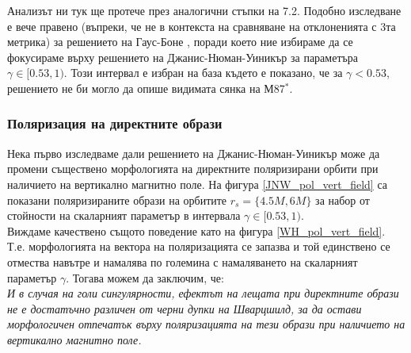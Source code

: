 Анализът ни тук ще протече през аналогични стъпки на 7.2. Подобно изследване е вече правено (въпреки, че не в контекста на сравняване на отклоненията с 3та метрика) за решението на Гаус-Боне \cite{Qin2021}, поради което ние избираме да се фокусираме върху решението на Джанис-Нюман-Уиникър за параметъра $\gamma \in [0.53, 1)$. Този интервал е избран на база \cite{Kocherlakota2021}  където е показано, че за $\gamma < 0.53$, решението не би могло да опише видимата сянка на М87$^*$. 

\subsubsection{Поляризация на директните образи}

Нека първо изследваме дали решението на Джанис-Нюман-Уиникър може да промени съществено морфологията на директните поляризирани орбити при наличието на вертикално магнитно поле. На фигура \ref{JNW_pol_vert_field} са показани поляризираните образи на орбитите $r_s = \{4.5M,6M\}$ за набор от стойности на скаларният параметър в интервала $\gamma\in[0.53,1)$.\\

Виждаме качествено същото поведение като на фигура \ref{WH_pol_vert_field}. Т.е. морфологията на вектора на поляризацията се запазва и той единствено се отмества навътре и намалява по големина с намаляването на скаларният параметър $\gamma$. Тогава можем да заключим, че:\\

\emph{И в случая на голи сингулярности, ефектът на лещата при директните образи не е достатъчно различен от черни дупки на Шварцшилд, за да остави морфологичен отпечатък върху поляризацията на тези образи при наличието на вертикално магнитно поле.}

